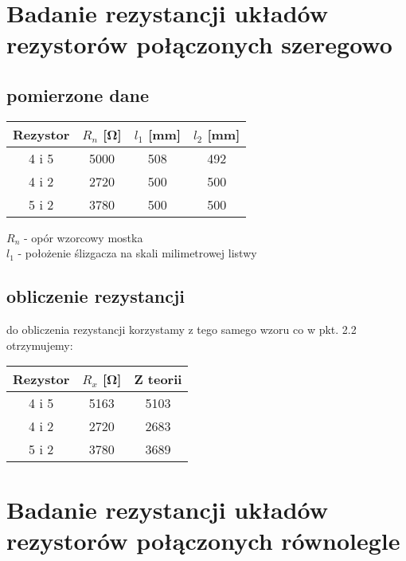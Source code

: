 \documentclass{article}
\begin{document}
\section{Badanie rezystancji układów rezystorów połączonych szeregowo}
\subsection{pomierzone dane}
\begin{center}
\begin{tabular}{ c |  c | c | c}
Rezystor & $R_n$ [\si{\ohm}] & $l_1$ [mm] & $l_2$ [mm]\\
\hline
 4 i 5 & 5000 & 508 & 492\\ 
 4 i 2 & 2720 & 500 & 500\\ 
 5 i 2 & 3780 & 500 & 500\\ 

\end{tabular}
\end{center}
$R_n$ - opór wzorcowy mostka\\ 
$l_1$ - położenie ślizgacza na skali milimetrowej listwy\\

\subsection{obliczenie rezystancji}
do obliczenia rezystancji korzystamy z tego samego wzoru co w pkt. 2.2\\
otrzymujemy: \\

\begin{center}
\begin{tabular}{ c | c | c}
Rezystor & $R_x$ [\si{\ohm}] & Z teorii\\
\hline
 4 i 5    & 5163 &  5103\\ 
 4 i 2    & 2720 & 2683\\ 
 5 i 2  & 3780 & 3689\\ 

 
\end{tabular}
\end{center}


\section{Badanie rezystancji układów rezystorów połączonych równolegle}
\end{document}
